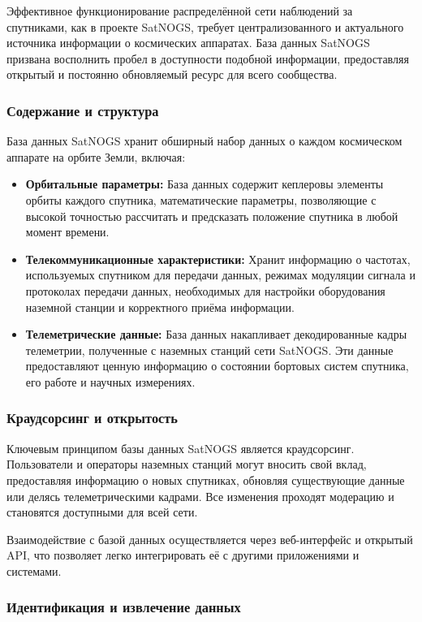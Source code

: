 \documentclass[12pt, a4paper]{extreport}
\begin{document}
Эффективное функционирование распределённой сети наблюдений за спутниками, как в проекте SatNOGS, требует централизованного и актуального источника информации о космических аппаратах.  База данных SatNOGS призвана восполнить пробел в доступности подобной информации, предоставляя открытый и постоянно обновляемый ресурс для всего сообщества.

\subsubsection{Содержание и структура}

База данных SatNOGS хранит обширный набор данных о каждом космическом аппарате на орбите Земли, включая:

\begin{itemize}
\item \textbf{Орбитальные параметры:} База данных содержит кеплеровы элементы орбиты каждого спутника,  математические параметры, позволяющие с высокой точностью  рассчитать и предсказать положение спутника в любой момент времени. 
\item \textbf{Телекоммуникационные характеристики:} Хранит информацию о частотах, используемых спутником для передачи данных,  режимах модуляции сигнала  и протоколах передачи данных, необходимых для настройки оборудования наземной станции  и корректного приёма информации.
\item \textbf{Телеметрические данные:}  База данных накапливает декодированные кадры телеметрии, полученные с наземных станций сети SatNOGS. Эти данные предоставляют ценную информацию о состоянии бортовых систем спутника, его работе и научных измерениях.
\end{itemize}

\subsubsection{Краудсорсинг и открытость}

Ключевым принципом базы данных SatNOGS является краудсорсинг. Пользователи и операторы наземных станций могут вносить свой вклад, предоставляя информацию о новых спутниках, обновляя существующие данные или делясь телеметрическими кадрами. Все изменения проходят модерацию и становятся доступными для всей сети.

Взаимодействие с базой данных осуществляется через веб-интерфейс и открытый API, что позволяет легко интегрировать её с другими приложениями и системами.

\subsubsection{Идентификация и извлечение данных}
\end{document}
